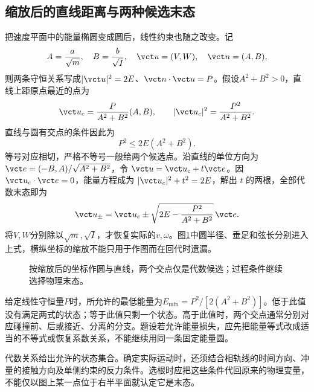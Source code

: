 \documentclass[11pt,openany,fontset=fandol]{ctexbook}
\theoremstyle{definition}\newtheorem{example}{例}[chapter]\newtheorem{exercise}{习题}[chapter]
\begin{document}
\subsection{缩放后的直线距离与两种候选末态}
把速度平面中的能量椭圆变成圆后，线性约束也随之改变。记
\[A=\frac a{\sqrt m},\quad B=\frac b{\sqrt I},
\quad \vct u=(V,W),\quad \vct n=(A,B),
\]
则两条守恒关系写成$|\vct u|^2=2E$、$\vct n\cdot\vct u=P$。假设$A^2+B^2>0$，直线上距原点最近的点为
\[\vct u_c=\frac{P}{A^2+B^2}(A,B),\qquad
|\vct u_c|^2=\frac{P^2}{A^2+B^2}.
\]
直线与圆有交点的条件因此为
\[\boxed{P^2\le2E(A^2+B^2)}.
\]
等号对应相切，严格不等号一般给两个候选点。沿直线的单位方向为 $\vct e=(-B,A)/\sqrt{A^2+B^2}$，令 $\vct u=\vct u_c+t\vct e$。因 $\vct u_c\cdot\vct e=0$，能量方程成为 $|\vct u_c|^2+t^2=2E$，解出 $t$ 的两根，全部代数末态即为
\[\vct u_\pm=\vct u_c
\pm\sqrt{2E-\frac{P^2}{A^2+B^2}}\,\vct e.
\]
将$V,W$分别除以$\sqrt m,\sqrt I$，才恢复实际的$v,\omega$。图\ref{mp4:fig:series-conservation-circle}中圆半径、垂足和弦长分别进入上式，横纵坐标的缩放不能只用于作图而在回代时遗漏。

\begin{figure}[H]\centering
{}
\caption{按缩放后的坐标作圆与直线，两个交点仅是代数候选；过程条件继续选择物理末态。}\label{mp4:fig:series-conservation-circle}
\end{figure}

给定线性守恒量$P$时，所允许的最低能量为$E_{\min}=P^2/[2(A^2+B^2)]$。低于此值没有满足两式的状态；等于此值只剩一个状态。高于此值时，两个交点通常分别对应碰撞前、后或接近、分离的分支。题设若允许能量损失，应先把能量等式改成适当的不等式或恢复系数关系，不能继续用同一条固定能量圆。

代数关系给出允许的状态集合。确定实际运动时，还须结合相轨线的时间方向、冲量的接触方向及单侧约束的反力条件。选根时应把这些条件代回原来的物理变量，不能仅以图上某一点位于右半平面就认定它是末态。
\end{document}
